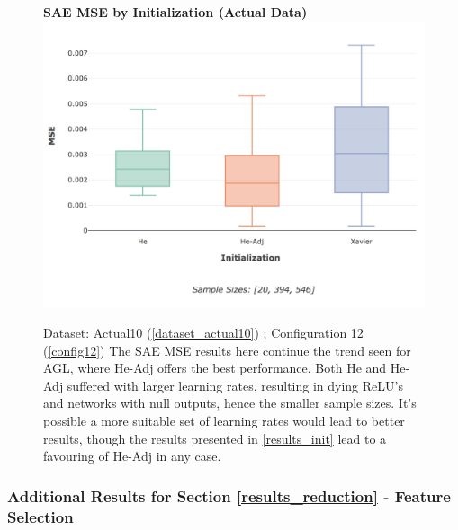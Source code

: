 \documentclass[a4paper,11pt,oneside]{article}
\theoremstyle{plain}
\theoremstyle{definition}
\begin{document}
	\begin{figure}[H]
		\centering 
		\textbf{SAE MSE by Initialization (Actual Data)} 
		\includegraphics[scale=0.3]{images/results/newinit/actual_mse_init.png}
		\caption[SAE MSE by Initialization (Actual Data)]{Dataset: Actual10 (\ref{dataset_actual10}) ; Configuration 12 (\ref{config12})
			\newline The SAE MSE results here continue the trend seen for AGL, where He-Adj offers the best performance. Both He and He-Adj suffered with larger learning rates, resulting in dying ReLU's and networks with null outputs, hence the smaller sample sizes. It's possible a more suitable set of learning rates would lead to better results, though the results presented in \ref{results_init} lead to a favouring of He-Adj in any case.}
		\label{figure-actual_mse_init}
	\end{figure}
	
	
	\subsubsection{Additional Results for Section \ref{results_reduction} - Feature Selection }\label{results_features_appendix}
	
\end{document}
